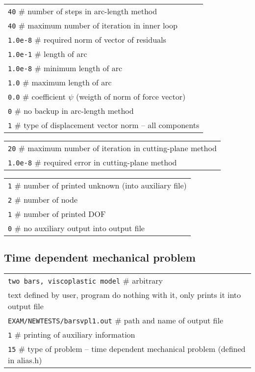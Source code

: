 \vspace{2mm}
\noindent
\begin{tabular}{l}
{\tt 40} $\#$ number of steps in arc-length method
\\
{\tt 40} $\#$ maximum number of iteration in inner loop
\\
{\tt 1.0e-8} $\#$ required norm of vector of residuals
\\
{\tt 1.0e-1} $\#$ length of arc
\\
{\tt 1.0e-8} $\#$ minimum length of arc
\\
{\tt 1.0} $\#$ maximum length of arc
\\
{\tt 0.0} $\#$ coefficient $\psi$ (weigth of norm of force vector)
\\
{\tt 0} $\#$ no backup in arc-length method
\\
{\tt 1} $\#$ type of displacement vector norm -- all components
\\
\end{tabular}

\vspace{2mm}
\noindent
\begin{tabular}{l}
{\tt 20} $\#$ maximum number of iteration in cutting-plane method
\\
{\tt 1.0e-8} $\#$ required error in cutting-plane method
\\
\end{tabular}

\vspace{2mm}
\noindent
\begin{tabular}{l}
{\tt 1} $\#$ number of printed unknown (into auxiliary file)
\\
{\tt 2} $\#$ number of node
\\
{\tt 1} $\#$ number of printed DOF
\\
{\tt 0} $\#$ no auxiliary output into output file
\end{tabular}

\subsection{Time dependent mechanical problem}

\noindent
\begin{tabular}{l}
{\tt two bars, viscoplastic model} $\#$ arbitrary
\\
text defined by user, program do nothing with it, only
prints it into output file
\\
{\tt EXAM/NEWTESTS/barsvpl1.out} $\#$ path and name of output file
\\
{\tt 1} $\#$ printing of auxiliary information
\\
{\tt 15} $\#$ type of problem -- time dependent mechanical problem (defined in alias.h)
\\
\end{tabular}

